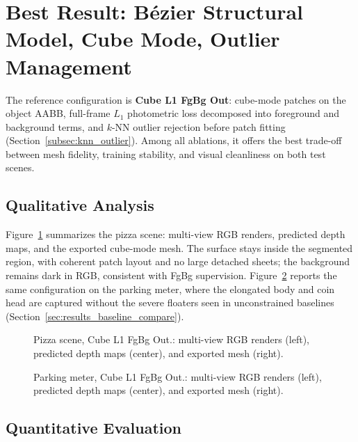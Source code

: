 \documentclass{report}
\begin{document}
\section{Best Result: B\'ezier Structural Model, Cube Mode, Outlier Management}
\label{sec:results_best_cube_outliers}

The reference configuration is \textbf{Cube L1 FgBg Out}: cube-mode patches on the object AABB, full-frame $L_1$ photometric loss decomposed into foreground and background terms, and $k$-NN outlier rejection before patch fitting (Section~\ref{subsec:knn_outlier}). Among all ablations, it offers the best trade-off between mesh fidelity, training stability, and visual cleanliness on both test scenes.

\subsection{Qualitative Analysis}
\label{subsec:results_best_qual}

Figure~\ref{fig:best_pizza_qual} summarizes the pizza scene: multi-view RGB renders, predicted depth maps, and the exported cube-mode mesh. The surface stays inside the segmented region, with coherent patch layout and no large detached sheets; the background remains dark in RGB, consistent with FgBg supervision. Figure~\ref{fig:best_parking_qual} reports the same configuration on the parking meter, where the elongated body and coin head are captured without the severe floaters seen in unconstrained baselines (Section~\ref{sec:results_baseline_compare}).

\begin{figure}[H]
    \centering
    \caption{Pizza scene, Cube L1 FgBg Out.: multi-view RGB renders (left), predicted depth maps (center), and exported mesh (right).}
    \label{fig:best_pizza_qual}
\end{figure}

\begin{figure}[H]
    \centering
    \caption{Parking meter, Cube L1 FgBg Out.: multi-view RGB renders (left), predicted depth maps (center), and exported mesh (right).}
    \label{fig:best_parking_qual}
\end{figure}

\subsection{Quantitative Evaluation}
\label{subsec:results_best_quant}
\end{document}

